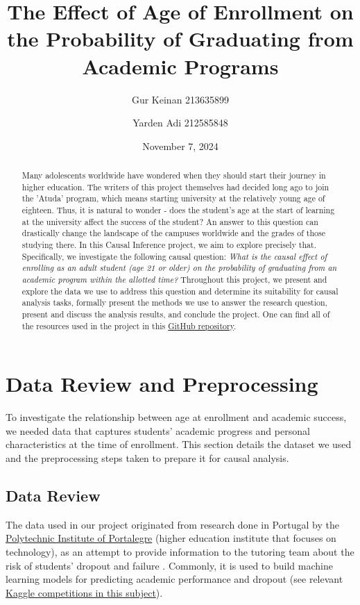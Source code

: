 \documentclass{article}
\title{The Effect of Age of Enrollment on the Probability of Graduating from Academic Programs}
\author{Gur Keinan 213635899 \and Yarden Adi 212585848}
\date{November 7, 2024}
\begin{document}
\maketitle

\begin{abstract}
    Many adolescents worldwide have wondered when they should start their journey in higher education. The writers of this project themselves had decided long ago to join the 'Atuda' program, which means starting university at the relatively young age of eighteen. Thus, it is natural to wonder - does the student's age at the start of learning at the university affect the success of the student? An answer to this question can drastically change the landscape of the campuses worldwide and the grades of those studying there. In this Causal Inference project, we aim to explore precisely that. Specifically, we investigate the following causal question: \emph{What is the causal effect of enrolling as an adult student (age 21 or older) on the probability of graduating from an academic program within the allotted time?} Throughout this project, we present and explore the data we use to address this question and determine its suitability for causal analysis tasks, formally present the methods we use to answer the research question, present and discuss the analysis results, and conclude the project. One can find all of the resources used in the project in this \href{https://github.com/GurKeinan/Causal-Inference-Project-Effect-of-Age-on-Graduating}{GitHub repository}.
\end{abstract}

\section{Data Review and Preprocessing}

To investigate the relationship between age at enrollment and academic success, we needed data that captures students' academic progress and personal characteristics at the time of enrollment. This section details the dataset we used and the preprocessing steps taken to prepare it for causal analysis.

\subsection{Data Review}

The data used in our project originated from research done in Portugal by the \href{https://www.ipportalegre.pt/pt/}{Polytechnic Institute of Portalegre} (higher education institute that focuses on technology), as an attempt to provide information to the tutoring team about the risk of students' dropout and failure \citep{data7110146}. Commonly, it is used to build machine learning models for predicting academic performance and dropout (see relevant \href{https://www.kaggle.com/datasets/ankanhore545/dropout-or-academic-success/data}{Kaggle competitions in this subject}).
\end{document}
